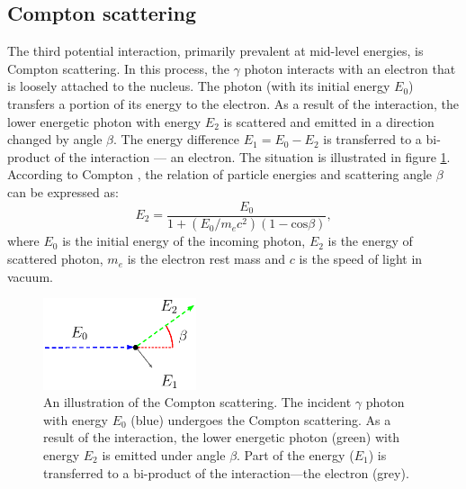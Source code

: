 \subsection{Compton scattering}
The third potential interaction, primarily prevalent at mid-level energies, is Compton scattering.
In this process, the $\gamma$ photon interacts with an electron that is loosely attached to the nucleus. 
The photon (with its initial energy $E_{0}$) transfers a portion of its energy to the electron.
As a result of the interaction, the lower energetic photon with energy $E_{2}$ is scattered and emitted in a direction changed by angle $\beta$. 
The energy difference $E_{1} = E_{0} - E_{2}$ is transferred to a bi-product of the interaction --- an electron.
The situation is illustrated in figure \ref{fig:scattering}.
According to Compton \cite{compton}, the relation of particle energies and scattering angle $\beta$ can be expressed as:
\begin{equation}
E_{2} = \frac{E_{0}}{  1 + (E_{0} / m_{e}c^{2}) (1 - \mathrm{cos} \beta)},
  \label{eq:compton_energies}
\end{equation}
where $E_{0}$ is the initial energy of the incoming photon, $E_{2}$ is the energy of scattered photon,  $m_{e}$ is the electron rest mass and $c$ is the speed of light in vacuum. 
\begin{figure}[!h]
    \centering
    \includegraphics[width=0.4\textwidth]{./fig/photos/compton_simple2.eps}
    \caption{An illustration of the Compton scattering. The incident $\gamma$ photon with energy $E_{0}$ (blue) undergoes the Compton scattering. As a result of the interaction, the lower energetic photon (green) with energy $E_{2}$ is emitted under angle $\beta$. Part of the energy ($E_{1}$) is transferred to a bi-product of the interaction---the electron (grey).}
    \label{fig:scattering}
\end{figure}
